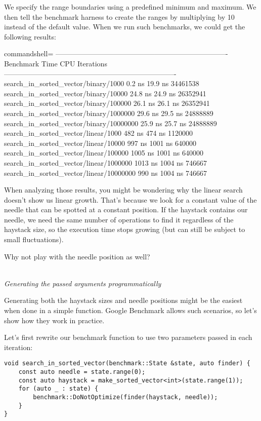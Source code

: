 We specify the range boundaries using a predefined minimum and maximum. We then tell the benchmark harness to create the ranges by multiplying by 10 instead of the default value. When we run such benchmarks, we could get the following results:

\begin{tcblisting}{commandshell={}}
-------------------------------------------------------------------------
Benchmark Time CPU Iterations
-------------------------------------------------------------------------
search_in_sorted_vector/binary/1000 0.2 ns 19.9 ns 34461538
search_in_sorted_vector/binary/10000 24.8 ns 24.9 ns 26352941
search_in_sorted_vector/binary/100000 26.1 ns 26.1 ns 26352941
search_in_sorted_vector/binary/1000000 29.6 ns 29.5 ns 24888889
search_in_sorted_vector/binary/10000000 25.9 ns 25.7 ns 24888889
search_in_sorted_vector/linear/1000 482 ns 474 ns 1120000
search_in_sorted_vector/linear/10000 997 ns 1001 ns 640000
search_in_sorted_vector/linear/100000 1005 ns 1001 ns 640000
search_in_sorted_vector/linear/1000000 1013 ns 1004 ns 746667
search_in_sorted_vector/linear/10000000 990 ns 1004 ns 746667
\end{tcblisting}

When analyzing those results, you might be wondering why the linear search doesn't show us linear growth. That's because we look for a constant value of the needle that can be spotted at a constant position. If the haystack contains our needle, we need the same number of operations to find it regardless of the haystack size, so the execution time stops growing (but can still be subject to small fluctuations).

Why not play with the needle position as well?

\hspace*{\fill} \\ %
\noindent
\textit{Generating the passed arguments programmatically}

Generating both the haystack sizes and needle positions might be the easiest when done in a simple function. Google Benchmark allows such scenarios, so let's show how they work in practice.

Let's first rewrite our benchmark function to use two parameters passed in each iteration:

\begin{lstlisting}[style=styleCXX]
void search_in_sorted_vector(benchmark::State &state, auto finder) {
	const auto needle = state.range(0);
	const auto haystack = make_sorted_vector<int>(state.range(1));
	for (auto _ : state) {
		benchmark::DoNotOptimize(finder(haystack, needle));
	}
}
\end{lstlisting}

